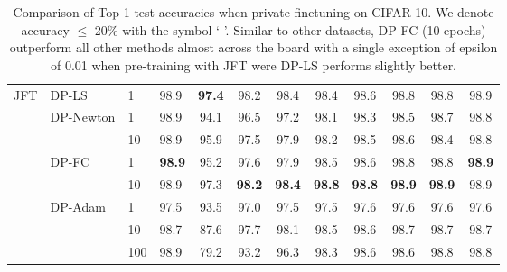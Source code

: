 \documentclass[letterpaper]{article} \usepackage{fullpage}
\begin{document}
\begin{table*}[!h]
\begin{tabular}{llll|cccccccc}
		\multirow{8}{*}{JFT} & \multirow{ 1}{*}{DP-LS}     & 1      & 98.9        & \textbf{97.4} & 98.2 & 98.4 & 98.4 & 98.6 & 98.8 & 98.8 & 98.9 \\ \addlinespace[0.1cm]
\addlinespace[0.1cm]
		                     & \multirow{ 2}{*}{DP-Newton} & 1      & 98.9        & 94.1 & 96.5 & 97.2 & 98.1 & 98.3 & 98.5 & 98.7 & 98.8 \\
		                     &                             & 10     & 98.9        & 95.9 & 97.5 & 97.9 & 98.2 & 98.5 & 98.6 & 98.4 & 98.8 \\
		\addlinespace[0.1cm]
\addlinespace[0.1cm]
		                     & \multirow{ 2}{*}{DP-FC}     & 1      & \textbf{98.9}        & 95.2 & 97.6 & 97.9 & 98.5 & 98.6 & 98.8 & 98.8 & \textbf{98.9} \\
		                     &                             & 10     & 98.9        & 97.3 & \textbf{98.2} & \textbf{98.4} & \textbf{98.8} & \textbf{98.8} & \textbf{98.9} & \textbf{98.9} & 98.9 \\
		\addlinespace[0.1cm]
\addlinespace[0.1cm]
		                     & \multirow{ 3}{*}{DP-Adam}   & 1      & 97.5        & 93.5 & 97.0 & 97.5 & 97.5 & 97.6 & 97.6 & 97.6 & 97.6 \\
		                     &                             & 10     & 98.7        & 87.6 & 97.7 & 98.1 & 98.5 & 98.6 & 98.7 & 98.7 & 98.7 \\ &                             & 100    & 98.9        & 79.2 & 93.2 & 96.3 & 98.3 & 98.6 & 98.6 & 98.8 & 98.8 \\ \bottomrule
	\end{tabular}
	\caption{Comparison of Top-1 test accuracies when private finetuning on CIFAR-10. We denote accuracy $\leq$ 20\% with the symbol `-'. Similar to other datasets, DP-FC (10 epochs) outperform all other methods almost across the board with a single exception of epsilon of 0.01 when pre-training with JFT were DP-LS performs slightly better.}
	\label{tab:cifar10}
\end{table*}
\end{document}
